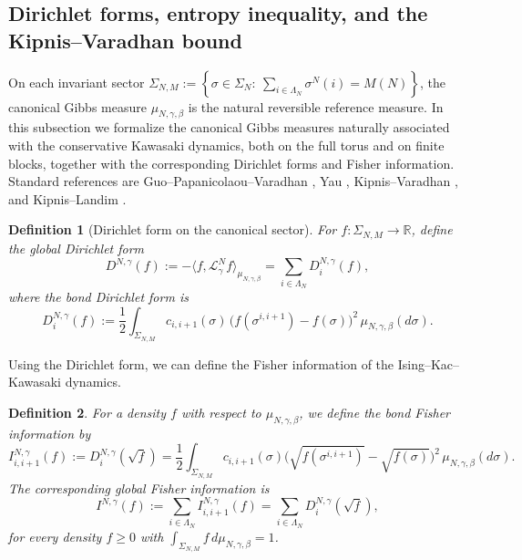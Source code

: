 \documentclass{article}
\newtheorem{definition}{Definition}[section]
\begin{document}
\subsection{Dirichlet forms, entropy inequality, and the Kipnis–Varadhan bound}

On each invariant sector \(\Sigma_{N,M}:=
\left\{
\sigma\in\Sigma_N:\ \sum_{i\in\Lambda_N}\sigma^N(i)=M(N)
\right\}\), the canonical Gibbs measure \(\mu_{N,\gamma,\beta}\) is the natural reversible reference measure.
In this subsection we formalize the canonical Gibbs measures naturally associated with the conservative Kawasaki dynamics, both on the full torus and on finite blocks, together with the corresponding Dirichlet forms and Fisher information.
Standard references are Guo--Papanicolaou--Varadhan \cite{GPV88}, Yau \cite{Yau91},
Kipnis--Varadhan \cite{KipnisVaradhan1986}, and Kipnis--Landim \cite{KipnisLandim1999}.


\begin{definition}[Dirichlet form on the canonical sector]
\label{def:global-canonical-dirichlet}
For \(f:\Sigma_{N,M}\to\mathbb R\), define the global Dirichlet form
\[
D^{N,\gamma}(f)
:=
-\bigl\langle f, \mathscr L_\gamma^{N} f\bigr\rangle_{\mu_{N,\gamma,\beta}}
= \sum_{i\in\Lambda_N}D_i^{N,\gamma}(f),
\]
where the bond Dirichlet form is
\[
 D_i^{N,\gamma}(f)
:=
\frac12
\int_{\Sigma_{N,M}}
c_{i,i+1}(\sigma)\,
\bigl(f(\sigma^{i,i+1})-f(\sigma)\bigr)^2\,
\mu_{N,\gamma,\beta}(d\sigma).
\]
\end{definition}

Using the Dirichlet form, we can define the Fisher information of the Ising–Kac–Kawasaki dynamics.
\begin{definition}
For a density \(f\) with respect to \(\mu_{N,\gamma,\beta}\), we define the bond Fisher information by
\begin{equation}
    I_{i,i+1}^{N,\gamma}(f) := D_{i}^{N,\gamma}(\sqrt f)
=
\frac12 \int_{\Sigma_{N,M}} c_{i,i+1}(\sigma)
\bigl(\sqrt{f(\sigma^{i,i+1})}-\sqrt{f(\sigma)}\bigr)^2\,
\mu_{N,\gamma,\beta}(d\sigma).
\end{equation}
The corresponding global Fisher information is
\[
I^{N,\gamma}(f):= \sum_{i\in\Lambda_N} I_{i,i+1}^{N,\gamma}(f) = \sum_{i \in \Lambda_N} D_i^{N,\gamma}(\sqrt f),
\]
for every density \(f\ge0\) with \(\int_{\Sigma_{N,M}} f\,d\mu_{N,\gamma,\beta}=1\).
\end{definition}
\end{document}
